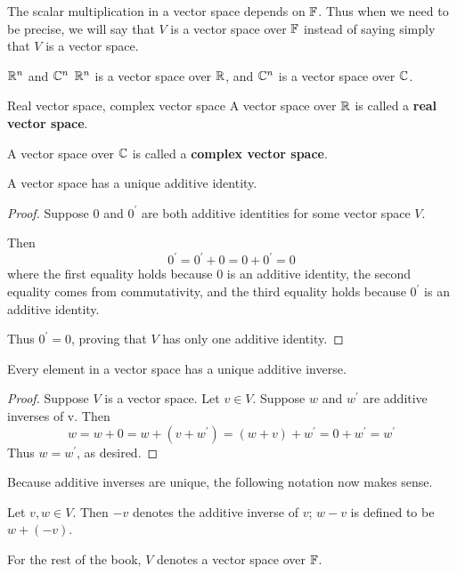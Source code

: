 The scalar multiplication in a vector space depends on $\mathbb F$. Thus when we need to be precise, we will say that $V$ is a vector space over $\mathbb F$ instead of saying simply that $V$ is a vector space. 

\begin{exmp}{$\mathbb R^n$ and $\mathbb C^n$}{}
$\mathbb R^n$ is a vector space over $\mathbb R$, and $\mathbb C^n$ is a vector space over $\mathbb C$.
\end{exmp}

\begin{defn}{Real vector space, complex vector space}{}
A vector space over $\mathbb R$ is called a \textbf{real vector space}.

A vector space over $\mathbb C$ is called a \textbf{complex vector space}.
\end{defn}

\begin{proposition}
A vector space has a unique additive identity.
\end{proposition}
\begin{proof}
Suppose $0$ and $0^\prime$ are both additive identities for some vector space $V$.

Then
\[ 0^\prime = 0^\prime + 0 = 0 + 0^\prime = 0 \]
where the first equality holds because $0$ is an additive identity, the second equality comes from commutativity, and the third equality holds because $0^\prime$ is an additive identity. 

Thus $0^\prime = 0$, proving that $V$ has only one additive identity.
\end{proof}

\begin{proposition}
Every element in a vector space has a unique additive inverse.
\end{proposition}
\begin{proof}
Suppose $V$ is a vector space. Let $v \in V$. Suppose $w$ and $w^\prime$ are additive inverses of v. Then
\[ w = w+0 = w+(v+w^\prime) = (w+v)+w^\prime = 0+w^\prime = w^\prime \]
Thus $w=w^\prime$, as desired.
\end{proof}

Because additive inverses are unique, the following notation now makes sense.
\begin{notation}
Let $v,w\in V$. Then $-v$ denotes the additive inverse of $v$; $w-v$ is defined to be $w+(-v)$.
\end{notation}

\begin{notation}
For the rest of the book, $V$ denotes a vector space over $\mathbb F$.
\end{notation}


